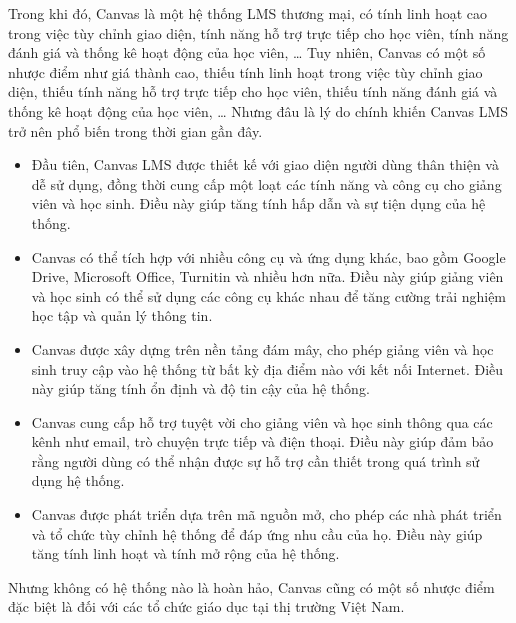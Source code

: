 \documentclass[../Thesis.tex]{subfiles}
\begin{document}
Trong khi đó, Canvas là một hệ thống LMS thương mại, có tính linh hoạt cao trong việc tùy chỉnh giao diện, tính năng hỗ trợ trực tiếp cho học viên, tính năng đánh giá và thống kê hoạt động của học viên, … Tuy nhiên, Canvas có một số nhược điểm như giá thành cao, thiếu tính linh hoạt trong việc tùy chỉnh giao diện, thiếu tính năng hỗ trợ trực tiếp cho học viên, thiếu tính năng đánh giá và thống kê hoạt động của học viên, …
Nhưng đâu là lý do chính khiến Canvas LMS trở nên phổ biến trong thời gian gần đây.
\begin{itemize}
    \item Đầu tiên, Canvas LMS được thiết kế với giao diện người dùng thân thiện và dễ sử dụng, đồng thời cung cấp một loạt các tính năng và công cụ cho giảng viên và học sinh. Điều này giúp tăng tính hấp dẫn và sự tiện dụng của hệ thống.
    \item Canvas có thể tích hợp với nhiều công cụ và ứng dụng khác, bao gồm Google Drive, Microsoft Office, Turnitin và nhiều hơn nữa. Điều này giúp giảng viên và học sinh có thể sử dụng các công cụ khác nhau để tăng cường trải nghiệm học tập và quản lý thông tin.
    \item Canvas được xây dựng trên nền tảng đám mây, cho phép giảng viên và học sinh truy cập vào hệ thống từ bất kỳ địa điểm nào với kết nối Internet. Điều này giúp tăng tính ổn định và độ tin cậy của hệ thống.
    \item Canvas cung cấp hỗ trợ tuyệt vời cho giảng viên và học sinh thông qua các kênh như email, trò chuyện trực tiếp và điện thoại. Điều này giúp đảm bảo rằng người dùng có thể nhận được sự hỗ trợ cần thiết trong quá trình sử dụng hệ thống.
    \item Canvas được phát triển dựa trên mã nguồn mở, cho phép các nhà phát triển và tổ chức tùy chỉnh hệ thống để đáp ứng nhu cầu của họ. Điều này giúp tăng tính linh hoạt và tính mở rộng của hệ thống.
\end{itemize}

Nhưng không có hệ thống nào là hoàn hảo, Canvas cũng có một số nhược điểm đặc biệt là đối với các tổ chức giáo dục tại thị trường Việt Nam.
\end{document}
